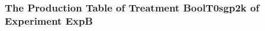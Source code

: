  \begin{frame}
 \fontsize{8pt}{9pt}\selectfont
 \frametitle{ The Production Table of Treatment BoolT0sgp2k of Experiment ExpB }

 \label{ExpBGrammarTable000.tex}  
 \end{frame}

